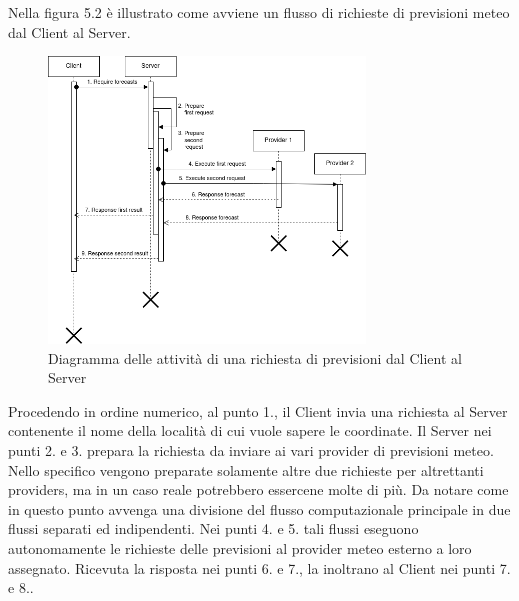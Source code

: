             Nella figura 5.2 è illustrato come avviene un flusso di richieste di previsioni meteo dal Client al Server.
        
            \begin{figure}[H]
            
                \caption{Diagramma delle attività di una richiesta di previsioni dal Client al Server}
                
                \label{fig:Forecast Request Activity Diagram}
                
                \centering
                
                \includegraphics[width=0.75\textwidth]{DrawIo/forecast_request_activity_diagram.png}
                
            \end{figure}
            
            Procedendo in ordine numerico, al punto 1., il Client invia una richiesta al Server contenente il nome della località di cui vuole sapere le coordinate. Il Server nei punti 2. e 3. prepara la richiesta da inviare ai vari provider di previsioni meteo. Nello specifico vengono preparate solamente altre due richieste per altrettanti providers, ma in un caso reale potrebbero essercene molte di più. Da notare come in questo punto avvenga una divisione del flusso computazionale principale in due flussi separati ed indipendenti. Nei punti 4. e 5. tali flussi eseguono autonomamente le richieste delle previsioni al provider meteo esterno a loro assegnato. Ricevuta la risposta nei punti 6. e 7., la inoltrano al Client nei punti 7. e 8..